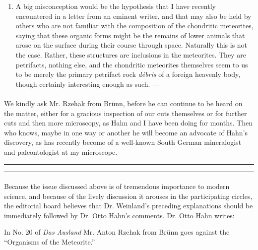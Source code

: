 \documentclass[a4paper, 12pt, oneside]{article}
\begin{document}
\begin{enumerate}
\item A big misconception would be the hypothesis that I have recently encountered in a letter from an eminent writer, and that may also be held by others who are not familiar with the composition of the chondritic meteorites, saying that these organic forms might be the remains of lower animals that arose on the surface during their course through space. Naturally this is not the case. Rather, these structures are inclusions in the meteorites. They are petrifacts, nothing else, and the chondritic meteorites themselves seem to us to be merely the primary petrifact rock \emph{débris} of a foreign heavenly body, though certainly interesting enough as such. ---
\end{enumerate}
\paragraph*{}
We kindly ask Mr. Rzehak from Brünn, before he can continue to be heard on the matter, either for a gracious inspection of our cuts themselves or for further cuts and then more microscopy, as Hahn and I have been doing for months. Then who knows, maybe in one way or another he will become an advocate of Hahn's discovery, as has recently become of a well-known South German mineralogist and paleontologist at my microscope.
\rule{\textwidth}{1.6pt}\vspace*{-\baselineskip}\vspace*{2pt} %
\rule{\textwidth}{0.4pt} %
\paragraph*{}
Because the issue discussed above is of tremendous importance to modern science, and because of the lively discussion it arouses in the participating circles, the editorial board believes that Dr. Weinland's preceding explanations should be immediately followed by Dr. Otto Hahn's comments. Dr. Otto Hahn writes:

In No. 20 of \emph{Das Ausland} Mr. Anton Rzehak from Brünn goes against the ``Organisms of the Meteorite.''
\end{document}
